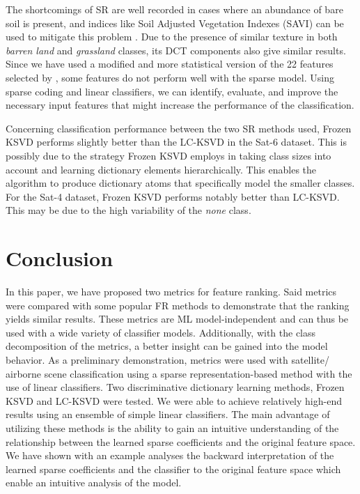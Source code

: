 The shortcomings of SR are well recorded in cases where an abundance of bare soil is present, and indices like Soil Adjusted Vegetation Indexes (SAVI) can be used to mitigate this problem \cite{Huete1988}. Due to the presence of similar texture in both \textit{barren land} and \textit{grassland} classes, its DCT components also give similar results. Since we have used a modified and more statistical version of the 22 features selected by \cite{Basu2015}, some features do not perform well with the sparse model. Using sparse coding and linear classifiers, we can identify, evaluate, and improve the necessary input features that might increase the performance of the classification.

Concerning classification performance between the two SR methods used, Frozen KSVD performs slightly better than the LC-KSVD in the Sat-6 dataset. This is possibly due to the strategy Frozen KSVD employs in taking class sizes into account and learning dictionary elements hierarchically. This enables the algorithm to produce dictionary atoms that specifically model the smaller classes. For the Sat-4 dataset, Frozen KSVD performs notably better than LC-KSVD. This may be due to the high variability of the \textit{none} class.

\section{Conclusion}
\label{sec:conclusion}

In this paper, we have proposed two metrics for feature ranking. Said metrics were compared with some popular FR methods to demonstrate that the ranking yields similar results. These metrics are ML model-independent and can thus be used with a wide variety of classifier models. Additionally, with the class decomposition of the metrics, a better insight can be gained into the model behavior. As a preliminary demonstration, metrics were used with satellite/ airborne scene classification using a sparse representation-based method with the use of linear classifiers. Two discriminative dictionary learning methods, Frozen KSVD and LC-KSVD were tested. We were able to achieve relatively high-end results using an ensemble of simple linear classifiers. The main advantage of utilizing these methods is the ability to gain an intuitive understanding of the relationship between the learned sparse coefficients and the original feature space. We have shown with an example analyses the backward interpretation of the learned sparse coefficients and the classifier to the original feature space which enable an intuitive analysis of the model. 

